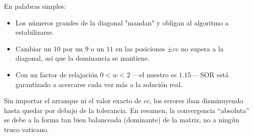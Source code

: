 En palabras simples:
\begin{itemize}
\item Los números grandes de la diagonal "mandan" y obligan al
  algoritmo a estabilizarse.  
\item Cambiar un \(10\) por un \(9\) o un \(11\) en las posiciones
  \(\pm cc\) no supera a la diagonal, así que la dominancia se mantiene.  
\item Con un factor de relajación \(0<w<2\) —el nuestro es \(1.15\)— SOR
  está garantizado a acercarse cada vez más a la solución real.
\end{itemize}

Sin importar el arranque ni el valor exacto de \(cc\),
los errores iban disminuyendo hasta quedar por debajo de la tolerancia.
En resumen, la convergencia “absoluta” se debe a la forma tan
bien balanceada (dominante) de la matriz, no a ningún truco vaticano.
